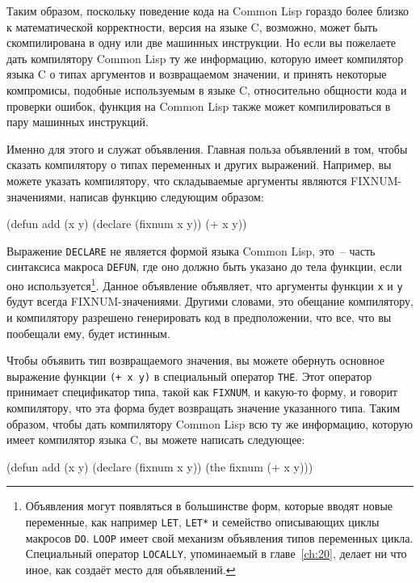Таким образом, поскольку поведение кода на Common Lisp гораздо более близко к
математической корректности, версия на языке C, возможно, может быть скомпилирована в одну
или две машинных инструкции. Но если вы пожелаете дать компилятору Common Lisp ту же
информацию, которую имеет компилятор языка C о типах аргументов и возвращаемом значении, и
принять некоторые компромисы, подобные используемым в языке C, относительно общности кода
и проверки ошибок, функция на Common Lisp также может компилироваться в пару машинных
инструкций.

Именно для этого и служат объявления. Главная польза объявлений в том, чтобы сказать компилятору о типах переменных и других выражений. Например, вы можете указать компилятору, что складываемые аргументы являются FIXNUM-значениями, написав функцию следующим образом:

\begin{myverb}
  (defun add (x y)
    (declare (fixnum x y))
    (+ x y))
\end{myverb}

Выражение \lstinline{DECLARE} не является формой языка Common Lisp, это~-- часть синтаксиса
макроса \lstinline{DEFUN}, где оно должно быть указано до тела функции, если оно
используется\footnote{Объявления могут появляться в большинстве форм, которые вводят новые
  переменные, как например \lstinline{LET}, \lstinline{LET*} и семейство описывающих циклы макросов
  \lstinline{DO}. \lstinline{LOOP} имеет свой механизм объявления типов переменных
  цикла. Специальный оператор \lstinline{LOCALLY}, упоминаемый в главе~\ref{ch:20}, делает ни
что иное, как создаёт место для объявлений.}. Данное объявление объявляет, что аргументы
функции \lstinline{x} и \lstinline{y} будут всегда FIXNUM-значениями. Другими словами, это обещание
компилятору, и компилятору разрешено генерировать код в предположении, что все, что вы
пообещали ему, будет истинным.

Чтобы объявить тип возвращаемого значения, вы можете обернуть основное выражение функции
\lstinline{(+ x y)} в специальный оператор \lstinline{THE}. Этот оператор принимает спецификатор
типа, такой как \lstinline{FIXNUM}, и какую-то форму, и говорит компилятору, что эта форма
будет возвращать значение указанного типа. Таким образом, чтобы дать компилятору Common
Lisp всю ту же информацию, которую имеет компилятор языка C, вы можете написать следующее:

\begin{myverb}
  (defun add (x y)
    (declare (fixnum x y))
    (the fixnum (+ x y)))
\end{myverb}

